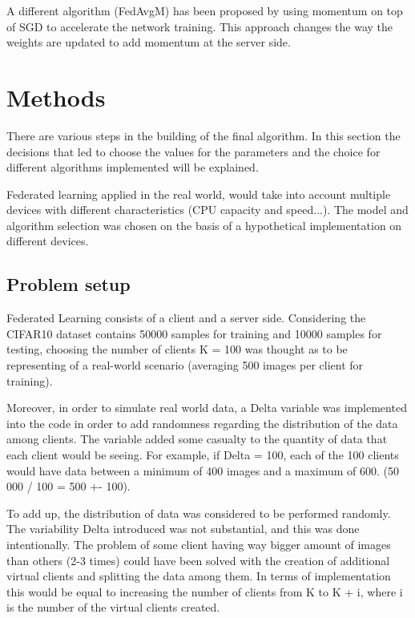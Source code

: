 \documentclass[twocolumn]{article}
\begin{document}
A different algorithm (FedAvgM) has been proposed by \cite{DBLP:journals/corr/abs-1909-06335} using momentum on top of SGD to accelerate the network training. This approach changes the way the weights are updated to add momentum at the server side.

\section{Methods} %
There are various steps in the building of the final algorithm. In this section the decisions that led to choose the values for the parameters and the choice for different algorithms implemented will be explained. 

Federated learning applied in the real world, would take into account multiple devices with different characteristics (CPU capacity and speed...). The model and algorithm selection was chosen on the basis of a hypothetical implementation on different devices.  

\subsection{Problem setup}
Federated Learning consists of a client and a server side. Considering the CIFAR10 dataset contains 50000 samples for training and 10000 samples for testing, choosing the number of clients K = 100 was thought as to be representing of a real-world scenario (averaging 500 images per client for training). 

Moreover, in order to simulate real world data, a Delta variable was implemented into the code in order to add randomness regarding the distribution of the data among clients. The variable added some casualty to the quantity of data that each client would be seeing. For example, if Delta = 100, each of the 100 clients would have data between a minimum of 400 images and a maximum of 600. (50 000 / 100 = 500 +- 100).


To add up, the distribution of data was considered to be performed randomly. The variability Delta introduced was not substantial, and this was done intentionally. The problem of some client having way bigger amount of images than others (2-3 times) could have been solved with the creation of additional virtual clients and splitting the data among them. In terms of implementation this would be equal to increasing the number of clients from K to K + i, where i is the number of the virtual clients created. 
\end{document}

